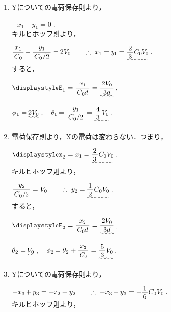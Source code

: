 \documentclass[../../../uem_phy_std_a.tex]{subfiles}
\begin{document}
    \begin{enumerate}
        \item Yについての電荷保存則より，
            
            \myspaceb%
            $\displaystyle%
                -x_1 + y_1 = 0 \;.
            $\\            
            キルヒホッフ則より，
            
            \myspaceb%
            $\displaystyle%
                \myfracc{x_1}{C_0} + \myfracc{y_1}{C_0/2} = 2V_0%
                \qquad \therefore \; x_1 = y_1
                = \uwave{\myfraca{2}{3}C_0 V_0} \;.
            $\\
            すると，
            
            \myspaceb%
            $\displaystyle%
                E_1 = \myfracc{x_1}{C_0 d} = \uwave{\myfracc{2V_0}{3d}} \;, 
            $

            \myspaceb%
            $\displaystyle%
                \phi_1 = \uwave{2V_0} \;,%
                \quad \theta_1 = \myfracc{y_1}{C_0/2} = \uwave{\myfraca{4}{3}V_0} \;.
            $            
        \item 電荷保存則より，Xの電荷は変わらない．つまり，
            
            \myspaceb%
            $\displaystyle%
                x_2 = x_1 = \uwave{\myfraca{2}{3}C_0 V_0} \;.
            $\\
            キルヒホッフ則より，
            
            \myspaceb%
            $\displaystyle%
                \myfracc{y_2}{C_0/2} = V_0%
                \qquad \therefore \; y_2 = \uwave{\myfraca{1}{2}C_0 V_0} \;.
            $\\
            すると，
            
            \myspaceb%
            $\displaystyle%
                E_2 = \myfracc{x_2}{C_0 d} = \uwave{\myfracc{2V_0}{3d}} \;,
            $

            \myspaceb%
            $\displaystyle%
                \theta_2 = \uwave{V_0} \;,%
                \quad \phi_2 = \theta_2 + \myfracc{x_2}{C_0}%
                = \uwave{\myfraca{5}{3}V_0} \;.
            $
        \item Yについての電荷保存則より，
            
            \myspaceb%
            $\displaystyle%
                -x_3 + y_3 = -x_2 + y_2%
                \qquad \therefore \; -x_3 + y_3 = -\myfraca{1}{6}C_0 V_0 \;.
            $\\
            キルヒホッフ則より，
            

\end{enumerate}
\end{document}
